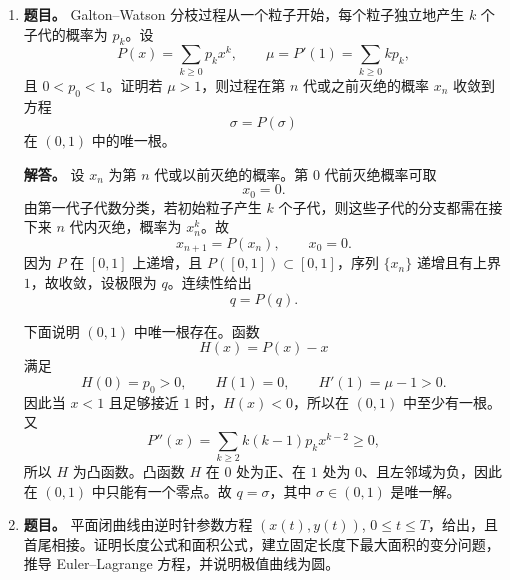 ﻿\documentclass[UTF8,12pt]{ctexart}
\begin{document}
\begin{enumerate}[label=\textbf{\arabic*.},leftmargin=2.2em]
\textbf{解答。} 先证必要性。一次 resigning 会改变任意圈中与该顶点相邻的两条圈边的符号；若圈经过该顶点，则圈中负边数改变 \(0\) 或 \(\pm2\)，其奇偶性不变；若圈不经过该顶点，则不变。因此每个圈中负边数的奇偶性在 resigning 下保持不变。若最终所有边为正，则每个圈负边数为 \(0\)，所以初始图不能有不平衡圈。

再证充分性。可逐个连通分支处理。固定一个连通分支，取一棵生成树 \(T\)，选根 \(r\)。对任意顶点 \(v\)，令从 \(r\) 到 \(v\) 的树路径上负边数的奇偶性为 \(\epsilon(v)\in\{0,1\}\)。若 \(\epsilon(v)=1\)，对 \(v\) 作 resigning；若 \(\epsilon(v)=0\)，不作。经过这些操作后，任意树边 \(uv\) 的新符号变为
\[
\operatorname{sgn}(uv)(-1)^{\epsilon(u)+\epsilon(v)}.
\]
由于 \(\epsilon(u)+\epsilon(v)\) 正好记录根到 \(u\)、根到 \(v\) 路径差出的这条边的负号奇偶性，所以每条树边都变为正。

现在考虑任意非树边 \(uv\)。它与树中 \(u\) 到 \(v\) 的唯一路径构成一个圈。该圈没有不平衡，故非树边的原始符号恰好等于树路径上负边数奇偶性的补偿。树边已全部变正后，非树边也必为正。于是整个连通分支所有边均可变正。各连通分支独立处理，充分性成立。

\item \textbf{题目。} Galton--Watson 分枝过程从一个粒子开始，每个粒子独立地产生 \(k\) 个子代的概率为 \(p_k\)。设
\[
P(x)=\sum_{k\ge0}p_kx^k,\qquad
\mu=P'(1)=\sum_{k\ge0}kp_k,
\]
且 \(0<p_0<1\)。证明若 \(\mu>1\)，则过程在第 \(n\) 代或之前灭绝的概率 \(x_n\) 收敛到方程
\[
\sigma=P(\sigma)
\]
在 \((0,1)\) 中的唯一根。

\textbf{解答。} 设 \(x_n\) 为第 \(n\) 代或以前灭绝的概率。第 \(0\) 代前灭绝概率可取
\[
x_0=0.
\]
由第一代子代数分类，若初始粒子产生 \(k\) 个子代，则这些子代的分支都需在接下来 \(n\) 代内灭绝，概率为 \(x_n^k\)。故
\[
x_{n+1}=P(x_n),\qquad x_0=0.
\]
因为 \(P\) 在 \([0,1]\) 上递增，且 \(P([0,1])\subset[0,1]\)，序列 \(\{x_n\}\) 递增且有上界 \(1\)，故收敛，设极限为 \(q\)。连续性给出
\[
q=P(q).
\]

下面说明 \((0,1)\) 中唯一根存在。函数
\[
H(x)=P(x)-x
\]
满足
\[
H(0)=p_0>0,\qquad H(1)=0,\qquad H'(1)=\mu-1>0.
\]
因此当 \(x<1\) 且足够接近 \(1\) 时，\(H(x)<0\)，所以在 \((0,1)\) 中至少有一根。又
\[
P''(x)=\sum_{k\ge2}k(k-1)p_kx^{k-2}\ge0,
\]
所以 \(H\) 为凸函数。凸函数 \(H\) 在 \(0\) 处为正、在 \(1\) 处为 \(0\)、且左邻域为负，因此在 \((0,1)\) 中只能有一个零点。故 \(q=\sigma\)，其中 \(\sigma\in(0,1)\) 是唯一解。

\item \textbf{题目。} 平面闭曲线由逆时针参数方程 \((x(t),y(t))\), \(0\le t\le T\)，给出，且首尾相接。证明长度公式和面积公式，建立固定长度下最大面积的变分问题，推导 Euler--Lagrange 方程，并说明极值曲线为圆。


\end{enumerate}
\end{document}
